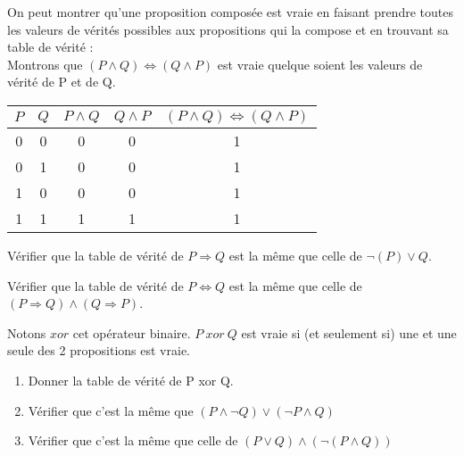 \documentclass[a4paper,12pt,french]{book}
\begin{document}
\begin{methode}
	On peut montrer qu'une proposition composée est vraie en faisant prendre toutes les valeurs de vérités possibles aux propositions qui la compose et en trouvant sa table de vérité :\\

	Montrons que $(P\wedge Q)\Leftrightarrow(Q\wedge P)$ est vraie quelque soient les valeurs de vérité de P et de Q.

	\begin{center}
		\begin{tabular}{|c|c|c|c|c|}
			\hline
			\rowcolor{lightgray}
			$P$ & $Q$ & $P\wedge Q$ & $Q \wedge P$ & $(P\wedge Q)\Leftrightarrow(Q\wedge P)$\\
			\hline
			\rowcolor{white}
			0 & 0 & 0 & 0 & 1\\
			\hline
			\rowcolor{white}
			0 & 1 & 0 & 0 & 1\\
			\hline
			\rowcolor{white}
			1 & 0 & 0 & 0 & 1\\
			\hline\rowcolor{white}
			1 & 1 & 1 & 1 & 1\\
			\hline
		\end{tabular}
	\end{center}
\end{methode}

\begin{exercice}[ : l'implication]
	Vérifier que la table de vérité de $P\Rightarrow Q$ est la même que celle de $\neg(P)\vee Q$.
\end{exercice}

\begin{exercice}
	Vérifier que la table de vérité de $P\Leftrightarrow Q$ est la même que celle de $(P\Rightarrow Q)\wedge(Q\Rightarrow P)$.
\end{exercice}

\begin{exercice}[ : le ou exclusif]

		Notons $xor$ cet opérateur binaire. $P\ xor\ Q$ est vraie si (et seulement si) une et une seule des 2 propositions est vraie.
		\begin{enumerate}[\bfseries 1.]
			\item 	Donner la table de vérité de P xor Q.
			\item 	Vérifier que c'est la même que $(P\wedge \neg Q)\vee(\neg P\wedge Q)$
			\item 	Vérifier que c'est la même que celle de $(P\vee Q)\wedge(\neg(P\wedge Q))$
		\end{enumerate}
\end{exercice}
\end{document}
